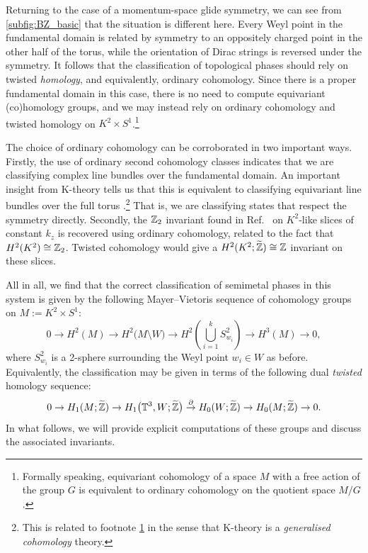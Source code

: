 Returning to the case of a momentum-space glide symmetry, we can see from \ref{subfig:BZ_basic} that the situation is different here. Every Weyl point in the fundamental domain is related by symmetry to an oppositely charged point in the other half of the torus, while the orientation of Dirac strings is reversed under the symmetry. It follows that the classification of topological phases should rely on twisted \emph{homology}, and equivalently, ordinary cohomology. Since there is a proper fundamental domain in this case, there is no need to compute equivariant (co)homology groups, and we may instead rely on ordinary cohomology and twisted homology on $K^2\times S^1$.\footnote{\label{ft:eq_cohom}
	Formally speaking, equivariant cohomology of a space $M$ with a free action of the group $G$ is equivalent to ordinary cohomology on the quotient space $M/G$ \parencite[Cor. 9.6]{Tu_equivariant}.}

The choice of ordinary cohomology can be corroborated in two important ways. Firstly, the use of ordinary second cohomology classes indicates that we are classifying complex line bundles over the fundamental domain. An important insight from K-theory tells us that this is equivalent to classifying equivariant line bundles over the full torus \parencite[Prop. 2.1]{Segal_K-theory}.\footnote{
	This is related to footnote \ref{ft:eq_cohom} in the sense that K-theory is a \emph{generalised cohomology} theory.}
That is, we are classifying states that respect the symmetry directly. Secondly, the $\mathbb{Z}_2$ invariant found in Ref.\ \cite{Fonseca-Vaidya_nonorientable} on $K^2$-like slices of constant $k_z$ is recovered using ordinary cohomology, related to the fact that $H^2(K^2)\cong\mathbb{Z}_2$. Twisted cohomology would give a $H^2(K^2;\widetilde{\mathbb{Z}})\cong\mathbb{Z}$ invariant on these slices.

All in all, we find that the correct classification of semimetal phases in this system is given by the following Mayer--Vietoris sequence of cohomology groups on $M := K^2\times S^1$:
\begin{equation}\label{eq:MV-nonorientable}
	0 \to H^2(M) \to H^2\big(M\setminus W\big) \to H^2\left(\bigcup_{i=1}^k S_{w_i}^2\right) \to H^3(M) \to 0,
\end{equation}
where $S_{w_i}^2$ is a 2-sphere surrounding the Weyl point $w_i\in W$ as before. Equivalently, the classification may be given in terms of the following dual \emph{twisted} homology sequence:
\begin{equation}\label{eq:homology-sequence-nonorientable}
	0 \to H_1(M;\widetilde{\mathbb{Z}}) \to H_1\big(\mathbb{T}^3, W;\widetilde{\mathbb{Z}}\big) \overset{\partial}{\to} H_0(W;\widetilde{\mathbb{Z}}) \to H_0(M;\widetilde{\mathbb{Z}}) \to 0.
\end{equation}
In what follows, we will provide explicit computations of these groups and discuss the associated invariants.


